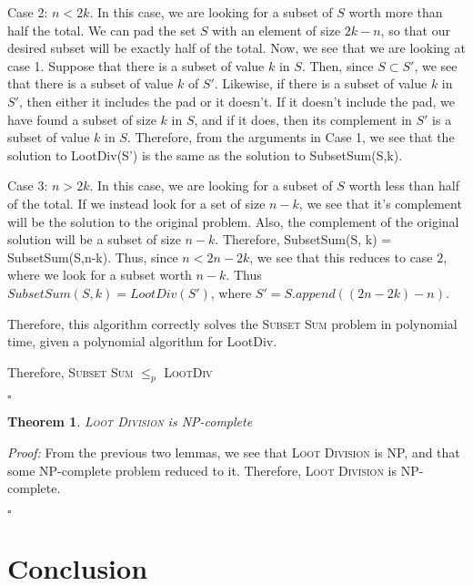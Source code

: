 \documentclass{article}
\newtheorem{theorem}{Theorem}[section]
\begin{document}
Case 2: $n < 2k$.  In this case, we are looking for a subset of $S$ worth more than half the total.  We can pad the set $S$ with an element of size $2k - n$, so that our desired subset will be exactly half of the total.  Now, we see that we are looking at case 1.  Suppose that there is a subset of value $k$ in $S$.  Then, since $S \subset S'$, we see that there is a subset of value $k$ of $S'$.  Likewise, if there is a subset of value $k$ in $S'$, then either it includes the pad or it doesn't.  If it doesn't include the pad, we have found a subset of size $k$ in $S$, and if it does, then its complement in $S'$ is a subset of value $k$ in $S$.  Therefore, from the arguments in Case 1, we see that the solution to LootDiv(S') is the same as the solution to SubsetSum(S,k).

Case 3: $n > 2k$.  In this case, we are looking for a subset of $S$ worth less than half of the total.  If we instead look for a set of size $n - k$, we see that it's complement will be the solution to the original problem.  Also, the complement of the original solution will be a subset of size $n-k$.  Therefore, SubsetSum(S, k) = SubsetSum(S,n-k).  Thus, since $n < 2n - 2k$, we see that this reduces to case $2$, where we look for a subset worth $n-k$.  Thus $SubsetSum(S, k) = LootDiv(S')$, where $S' = S.append((2n - 2k) - n)$.

Therefore, this algorithm correctly solves the \textsc{Subset Sum} problem in polynomial time, given a polynomial algorithm for LootDiv.  

Therefore, \textsc{Subset Sum} $\leq_p$  \textsc{LootDiv} 

\begin{flushright}
$\square$
\end{flushright}

\begin{theorem}
\textsc{Loot Division} is NP-complete
\end{theorem}

\textit{Proof:}  From the previous two lemmas, we see that \textsc{Loot Division} is NP, and that some NP-complete problem reduced to it.  Therefore, \textsc{Loot Division} is NP-complete.

\begin{flushright}
$\square$
\end{flushright}

\section{Conclusion}
\end{document}
